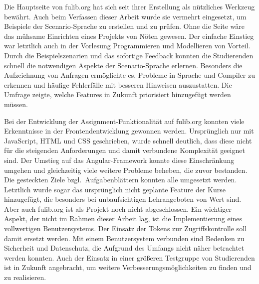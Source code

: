 Die Hauptseite von fulib.org hat sich seit ihrer Erstellung als nützliches Werkzeug bewährt.
Auch beim Verfassen dieser Arbeit wurde sie vermehrt eingesetzt, um Beispiele der Scenario-Sprache zu erstellen und zu prüfen.
Ohne die Seite wäre das mühsame Einrichten eines Projekts von Nöten gewesen.
Der einfache Einstieg war letztlich auch in der Vorlesung Programmieren und Modellieren von Vorteil.
Durch die Beispielszenarien und das sofortige Feedback konnten die Studierenden schnell die notwendigen Aspekte der Scenario-Sprache erlernen.
Besonders die Aufzeichnung von Anfragen ermöglichte es, Probleme in Sprache und Compiler zu erkennen und häufige Fehlerfälle mit besseren Hinweisen auszustatten.
Die Umfrage zeigte, welche Features in Zukunft priorisiert hinzugefügt werden müssen.

Bei der Entwicklung der Assignment-Funktionalität auf fulib.org konnten viele Erkenntnisse in der Frontendentwicklung gewonnen werden.
Ursprünglich nur mit JavaScript, HTML und CSS geschrieben, wurde schnell deutlich, dass diese nicht für die steigenden Anforderungen und damit verbundene Komplexität geeignet sind.
Der Umstieg auf das Angular-Framework konnte diese Einschränkung umgehen und gleichzeitig viele weitere Probleme beheben, die zuvor bestanden.
Die gesteckten Ziele bzgl.\ Aufgabenblättern konnten alle umgesetzt werden.
Letztlich wurde sogar das ursprünglich nicht geplante Feature der Kurse hinzugefügt, die besonders bei unbaufsichtigen Lehrangeboten von Wert sind.
Aber auch fulib.org ist als Projekt noch nicht abgeschlossen.
Ein wichtiger Aspekt, der nicht im Rahmen dieser Arbeit lag, ist die Implementierung eines vollwertigen Benutzersystems.
Der Einsatz der Tokens zur Zugriffskontrolle soll damit ersetzt werden.
Mit einem Benutzersystem verbunden sind Bedenken zu Sicherheit und Datenschutz, die Aufgrund des Umfangs nicht näher betrachtet werden konnten.
Auch der Einsatz in einer größeren Testgruppe von Studierenden ist in Zukunft angebracht, um weitere Verbesserungsmöglichkeiten zu finden und zu realisieren.
